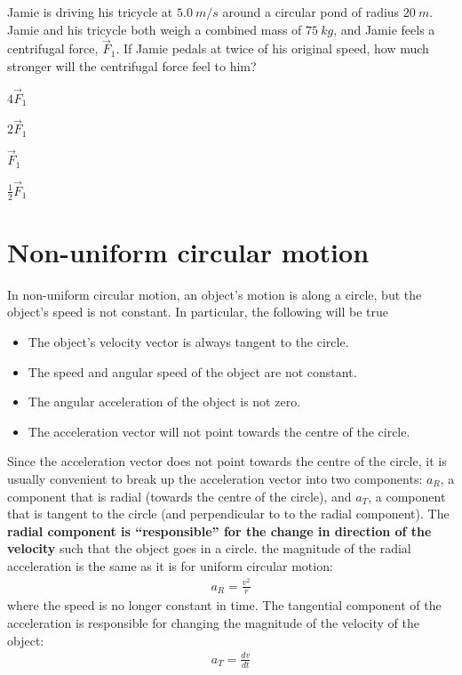 \begin{checkpoint}
\begin{MCquestion}{Jamie is driving his tricycle at $\SI{5.0}{m/s}$ around a circular pond of radius $\SI{20}{m}$. Jamie and his tricycle both weigh a combined mass of $\SI{75}{kg}$, and Jamie feels a centrifugal force, $\vec F_1$. If Jamie pedals at twice of his original speed, how much stronger will the centrifugal force feel to him?}
\item $4$$\vec F_1$ %
\item $2$$\vec F_1$
\item $\vec F_1$
\item $\frac{1}{2}$$\vec F_1$
\end{MCquestion}
\end{checkpoint}

\section{Non-uniform circular motion}
In non-uniform circular motion, an object's motion is along a circle, but the object's speed is not constant. In particular, the following will be true
\begin{itemize}
\item The object's velocity vector is always tangent to the circle.
\item The speed and angular speed of the object are not constant.
\item The angular acceleration of the object is not zero.
\item The acceleration vector will not point towards the centre of the circle. 
\end{itemize}
Since the acceleration vector does not point towards the centre of the circle, it is usually convenient to break up the acceleration vector into two components: $a_R$, a component that is radial (towards the centre of the circle), and $a_T$, a component that is tangent to the circle (and perpendicular to to the radial component). The \textbf{radial component is ``responsible'' for the change in direction of the velocity} such that the object goes in a circle. the magnitude of the radial acceleration is the same as it is for uniform circular motion:
\begin{align*}
a_R=\frac{v^2}{r}
\end{align*}
where the speed is no longer constant in time. The tangential component of the acceleration is responsible for changing the magnitude of the velocity of the object:
\begin{align*}
a_T = \frac{dv}{dt}
\end{align*}


